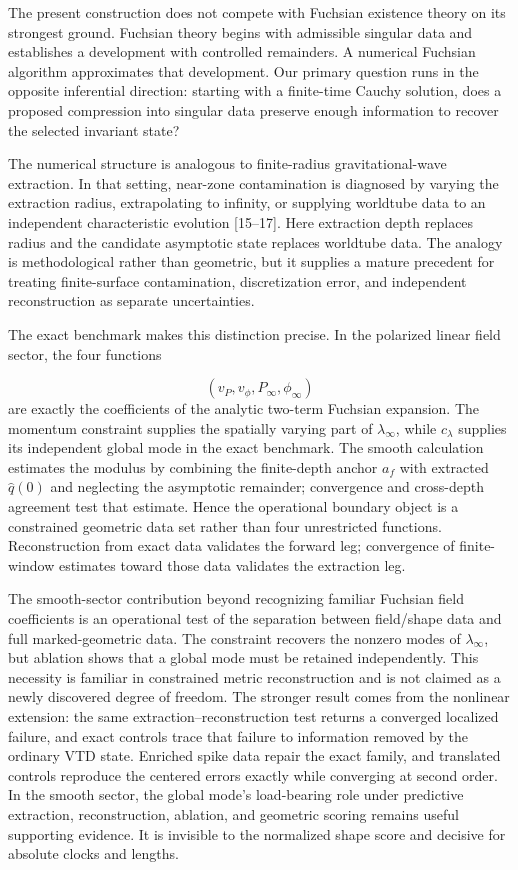 \documentclass{iopjournal}
\begin{document}
The present construction does not compete with Fuchsian existence theory on its strongest ground. Fuchsian theory begins with admissible singular data and establishes a development with controlled remainders. A numerical Fuchsian algorithm approximates that development. Our primary question runs in the opposite inferential direction: starting with a finite-time Cauchy solution, does a proposed compression into singular data preserve enough information to recover the selected invariant state?

The numerical structure is analogous to finite-radius gravitational-wave extraction. In that setting, near-zone contamination is diagnosed by varying the extraction radius, extrapolating to infinity, or supplying worldtube data to an independent characteristic evolution [15--17]. Here extraction depth replaces radius and the candidate asymptotic state replaces worldtube data. The analogy is methodological rather than geometric, but it supplies a mature precedent for treating finite-surface contamination, discretization error, and independent reconstruction as separate uncertainties.

The exact benchmark makes this distinction precise. In the polarized linear field sector, the four functions

\[
(v_P,v_\phi,P_\infty,\phi_\infty)
\]
are exactly the coefficients of the analytic two-term Fuchsian expansion. The momentum constraint supplies the spatially varying part of $\lambda_\infty$, while $c_\lambda$ supplies its independent global mode in the exact benchmark. The smooth calculation estimates the modulus by combining the finite-depth anchor $a_f$ with extracted $\widehat q(0)$ and neglecting the asymptotic remainder; convergence and cross-depth agreement test that estimate. Hence the operational boundary object is a constrained geometric data set rather than four unrestricted functions. Reconstruction from exact data validates the forward leg; convergence of finite-window estimates toward those data validates the extraction leg.

The smooth-sector contribution beyond recognizing familiar Fuchsian field coefficients is an operational test of the separation between field/shape data and full marked-geometric data. The constraint recovers the nonzero modes of $\lambda_\infty$, but ablation shows that a global mode must be retained independently. This necessity is familiar in constrained metric reconstruction and is not claimed as a newly discovered degree of freedom. The stronger result comes from the nonlinear extension: the same extraction--reconstruction test returns a converged localized failure, and exact controls trace that failure to information removed by the ordinary VTD state. Enriched spike data repair the exact family, and translated controls reproduce the centered errors exactly while converging at second order. In the smooth sector, the global mode's load-bearing role under predictive extraction, reconstruction, ablation, and geometric scoring remains useful supporting evidence. It is invisible to the normalized shape score and decisive for absolute clocks and lengths.
\end{document}
